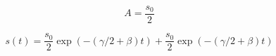 \documentclass[a4paper]{article}
\begin{document}
\begin{answer}[Problema 7]
\begin{enumerate}
       $$A = \frac{s_0}{2}$$
        \end{enumerate}
          $$s(t) = \frac{s_0}{2}\exp{(-(\gamma/2 + \beta )t)}+ \frac{s_0}{2}\exp{(-(\gamma/2 + \beta )t)}$$
 
       
    \end{answer}
    
 
    
    
    
    
    
\end{document}
